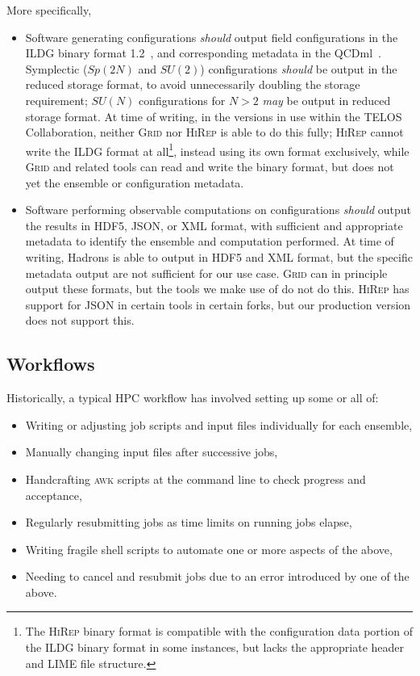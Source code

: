 \documentclass{article}
\newcommand\rfcword[1]{\emph{#1}\xspace}
\newcommand\should{\rfcword{should}}
\newcommand\may{\rfcword{may}}
\newcommand\program[1]{\textsc{#1}\xspace}
\begin{document}
More specifically,
\begin{itemize}
  \item
        Software generating configurations
        \should output field configurations in the ILDG binary format 1.2~\cite{ildg-binary},
        and corresponding metadata in the QCDml~\cite{Maynard:2004wg}.
        Symplectic ($Sp(2N)$ and $SU(2)$) configurations
        \should be output in the reduced storage format,
        to avoid unnecessarily doubling the storage requirement;
        $SU(N)$ configurations for $N>2$ \may be output in reduced storage format.
        At time of writing,
        in the versions in use within the TELOS Collaboration,
        neither \program{Grid} nor \program{HiRep} is able to do this fully;
        \program{HiRep} cannot write the ILDG format at all\footnote{
          The \program{HiRep} binary format is compatible with
          the configuration data portion of the ILDG binary format
          in some instances,
          but lacks the appropriate header and LIME file structure.
        },
        instead using its own format exclusively,
        while \program{Grid} and related tools can read and write the binary format,
        but does not yet the ensemble or configuration metadata.
  \item
        Software performing observable computations on configurations
        \should output the results in HDF5, JSON, or XML format,
        with sufficient and appropriate metadata to identify the ensemble and computation performed.
        At time of writing,
        Hadrons is able to output in HDF5 and XML format,
        but the specific metadata output are not sufficient for our use case.
        \program{Grid} can in principle output these formats,
        but the tools we make use of do not do this.
        \program{HiRep} has support for JSON in certain tools in certain forks,
        but our production version does not support this.
\end{itemize}


\subsection{Workflows}

Historically,
a typical HPC workflow has involved setting up some or all of:

\begin{itemize}
  \item
        Writing or adjusting job scripts and input files individually for each ensemble,
  \item
        Manually changing input files after successive jobs,
  \item
        Handcrafting \program{awk} scripts at the command line to check progress and acceptance,
  \item
        Regularly resubmitting jobs as time limits on running jobs elapse,
  \item
        Writing fragile shell scripts to automate one or more aspects of the above,
  \item
        Needing to cancel and resubmit jobs due to an error introduced by one of the above.
\end{itemize}
\end{document}
